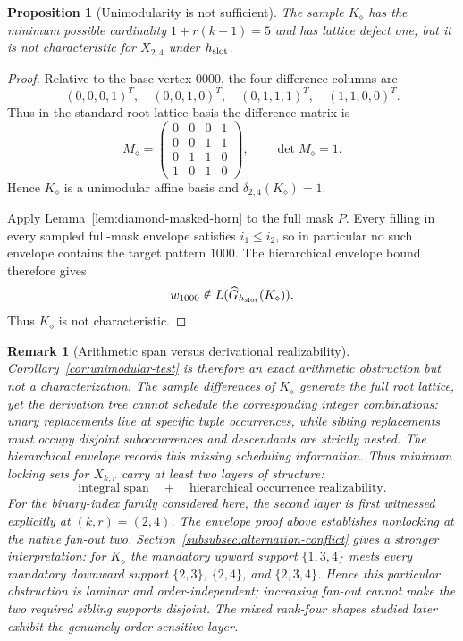 \documentclass[11pt]{article}
\newtheorem{proposition}[definition]{Proposition}
\newtheorem{remark}[definition]{Remark}
\begin{document}
\begin{proposition}[Unimodularity is not sufficient]
\label{prop:unimodular-not-sufficient}
The sample $K_{\diamond}$ has the minimum possible cardinality
$1+r(k-1)=5$ and has lattice defect one, but it is not characteristic for
$X_{2,4}$ under $h_{\rm slot}$.
\end{proposition}

\begin{proof}
Relative to the base vertex $0000$, the four difference columns are
\[
 (0,0,0,1)^T,\quad
 (0,0,1,0)^T,\quad
 (0,1,1,1)^T,\quad
 (1,1,0,0)^T.
\]
Thus in the standard root-lattice basis the difference matrix is
\[
 M_{\diamond}=
 \begin{pmatrix}
 0&0&0&1\\
 0&0&1&1\\
 0&1&1&0\\
 1&0&1&0
 \end{pmatrix},
 \qquad
 \det M_{\diamond}=1.
\]
Hence $K_{\diamond}$ is a unimodular affine basis and
$\delta_{2,4}(K_{\diamond})=1$.

Apply Lemma~\ref{lem:diamond-masked-horn} to the full mask $P$.  Every filling
in every sampled full-mask envelope satisfies $i_1\le i_2$, so in particular
no such envelope contains the target pattern $1000$.  The hierarchical
envelope bound therefore gives
\[
  w_{1000}\notin L(\widehat G_{h_{\rm slot}}(K_{\diamond})).
\]
Thus $K_{\diamond}$ is not characteristic.
\end{proof}

\begin{remark}[Arithmetic span versus derivational realizability]
Corollary~\ref{cor:unimodular-test} is therefore an exact arithmetic
obstruction but not a characterization.  The sample differences of
$K_{\diamond}$ generate the full root lattice, yet the derivation tree cannot
schedule the corresponding integer combinations: unary replacements live at
specific tuple occurrences, while sibling replacements must occupy disjoint
suboccurrences and descendants are strictly nested.  The hierarchical envelope
records this missing scheduling information.  Thus minimum locking sets for
$X_{k,r}$ carry at least two layers of structure:
\[
 \boxed{
   \text{integral span}
   \quad+\quad
   \text{hierarchical occurrence realizability}.
 }
\]
For the binary-index family considered here, the second layer is first witnessed explicitly at $(k,r)=(2,4)$.
The envelope proof above establishes nonlocking at the native fan-out two.
Section~\ref{subsubsec:alternation-conflict} gives a stronger interpretation:
for $K_{\diamond}$ the mandatory upward support $\{1,3,4\}$ meets every
mandatory downward support $\{2,3\}$, $\{2,4\}$, and $\{2,3,4\}$.  Hence
this particular obstruction is laminar and order-independent; increasing
fan-out cannot make the two required sibling supports disjoint.  The mixed
rank-four shapes studied later exhibit the genuinely order-sensitive layer.
\end{remark}
\end{document}
